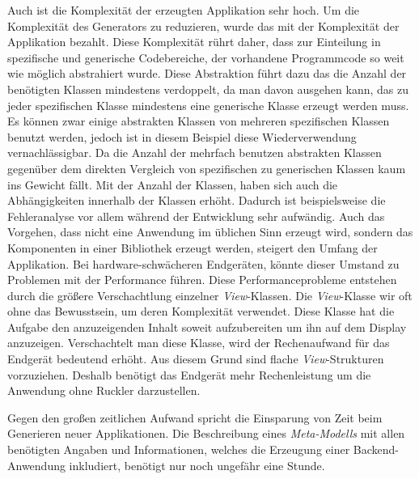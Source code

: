 Auch ist die Komplexität der erzeugten Applikation sehr hoch. Um die Komplexität des Generators zu reduzieren, wurde das mit der Komplexität der Applikation bezahlt. Diese Komplexität rührt daher, dass zur Einteilung in spezifische und generische Codebereiche, der vorhandene Programmcode so weit wie möglich abstrahiert wurde. Diese Abstraktion führt dazu das die Anzahl der benötigten Klassen mindestens verdoppelt, da man davon ausgehen kann, das zu jeder spezifischen Klasse mindestens eine generische Klasse erzeugt werden muss. Es können zwar einige abstrakten Klassen von mehreren spezifischen Klassen benutzt werden, jedoch ist in diesem Beispiel diese Wiederverwendung vernachlässigbar. Da die Anzahl der mehrfach benutzen abstrakten Klassen gegenüber dem direkten Vergleich von spezifischen zu generischen Klassen kaum ins Gewicht fällt. Mit der Anzahl der Klassen, haben sich auch die Abhängigkeiten innerhalb der Klassen erhöht. Dadurch ist beispielsweise die Fehleranalyse vor allem während der Entwicklung sehr aufwändig. Auch das Vorgehen, dass nicht eine Anwendung im üblichen Sinn erzeugt wird, sondern das Komponenten in einer Bibliothek erzeugt werden, steigert den Umfang der Applikation. Bei hardware-schwächeren Endgeräten, könnte dieser Umstand zu Problemen mit der Performance führen. Diese Performanceprobleme entstehen durch die größere Verschachtlung einzelner \textit{View}-Klassen. Die \textit{View}-Klasse wir oft ohne das Bewusstsein, um deren Komplexität verwendet. Diese Klasse hat die Aufgabe den anzuzeigenden Inhalt soweit aufzubereiten um ihn auf dem Display anzuzeigen. Verschachtelt man diese Klasse, wird der Rechenaufwand für das Endgerät bedeutend erhöht. Aus diesem Grund sind flache \textit{View}-Strukturen vorzuziehen. Deshalb benötigt das Endgerät mehr Rechenleistung um die Anwendung ohne Ruckler darzustellen.

Gegen den großen zeitlichen Aufwand spricht die Einsparung von Zeit beim Generieren neuer Applikationen. Die Beschreibung eines \textit{Meta-Modells} mit allen benötigten Angaben und Informationen, welches die Erzeugung einer Backend-Anwendung inkludiert, benötigt nur noch ungefähr eine Stunde. 